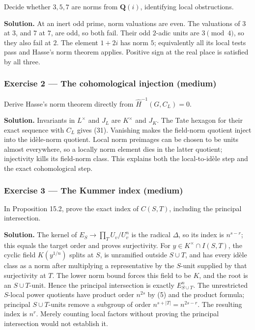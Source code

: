 \documentclass[11pt,a4paper]{article}
\begin{document}
Decide whether \(3,5,7\) are norms from \(\mathbf Q(i)\), identifying
local obstructions.

\textbf{Solution.} At an inert odd prime, norm valuations are even. The
valuations of \(3\) at \(3\), and \(7\) at \(7\), are odd, so both fail.
Their odd \(2\)-adic units are \(3\pmod4\), so they also fail at \(2\).
The element \(1+2i\) has norm \(5\); equivalently all its local tests
pass and Hasse's norm theorem applies. Positive sign at the real place
is satisfied by all three.

\subsubsection{Exercise 2 --- The cohomological injection
(medium)}\label{exercise-2-the-cohomological-injection-medium}

Derive Hasse's norm theorem directly from \(\widehat H^{-1}(G,C_L)=0\).

\textbf{Solution.} Invariants in \(L^\times\) and \(J_L\) are
\(K^\times\) and \(J_K\). The Tate hexagon for their exact sequence with
\(C_L\) gives (31). Vanishing makes the field-norm quotient inject into
the idèle-norm quotient. Local norm preimages can be chosen to be units
almost everywhere, so a locally norm element dies in the latter
quotient; injectivity kills its field-norm class. This explains both the
local-to-idèle step and the exact cohomological step.

\subsubsection{Exercise 3 --- The Kummer index
(medium)}\label{exercise-3-the-kummer-index-medium}

In Proposition 15.2, prove the exact index of \(C(S,T)\), including the
principal intersection.

\textbf{Solution.} The kernel of \(E_S\to\prod_T U_v/U_v^n\) is the
radical \(\Delta\), so its index is \(n^{s-r}\); this equals the target
order and proves surjectivity. For \(y\in K^\times\cap I(S,T)\), the
cyclic field \(K(y^{1/n})\) splits at \(S\), is unramified outside
\(S\cup T\), and has every idèle class as a norm after multiplying a
representative by the \(S\)-unit supplied by that surjectivity at \(T\).
The lower norm bound forces this field to be \(K\), and the root is an
\(S\cup T\)-unit. Hence the principal intersection is exactly
\(E_{S\cup T}^n\). The unrestricted \(S\)-local power quotients have
product order \(n^{2s}\) by (5) and the product formula; principal
\(S\cup T\)-units remove a subgroup of order \(n^{s+|T|}=n^{2s-r}\). The
resulting index is \(n^r\). Merely counting local factors without
proving the principal intersection would not establish it.
\end{document}
